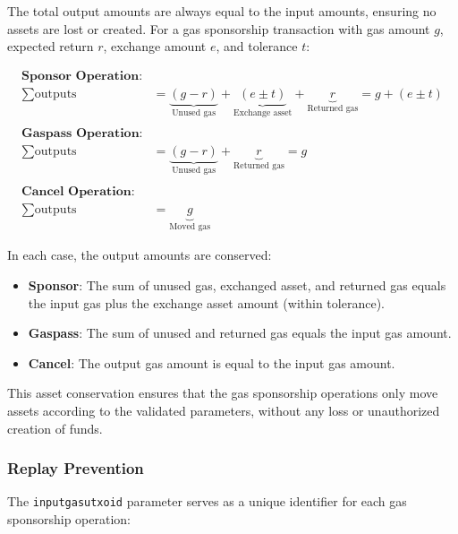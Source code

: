 The total output amounts are always equal to the input amounts, ensuring no assets are lost or created.
For a gas sponsorship transaction with gas amount $g$, expected return $r$, exchange amount $e$, and tolerance $t$:

\begin{equation*}
\begin{aligned}
\textbf{Sponsor Operation:} \\
\sum \text{outputs} &= \underbrace{(g - r)}_{\text{Unused gas}} + \underbrace{(e \pm t)}_{\text{Exchange asset}} + \underbrace{r}_{\text{Returned gas}} = g + (e \pm t) \\
\\
\textbf{Gaspass Operation:} \\
\sum \text{outputs} &= \underbrace{(g - r)}_{\text{Unused gas}} + \underbrace{r}_{\text{Returned gas}} = g \\
\\
\textbf{Cancel Operation:} \\
\sum \text{outputs} &= \underbrace{g}_{\text{Moved gas}}
\end{aligned}
\end{equation*}

In each case, the output amounts are conserved:
\begin{itemize}
\item \textbf{Sponsor}: The sum of unused gas, exchanged asset, and returned gas equals the input gas plus the exchange asset amount (within tolerance).
\item \textbf{Gaspass}: The sum of unused and returned gas equals the input gas amount.
\item \textbf{Cancel}: The output gas amount is equal to the input gas amount.
\end{itemize}

This asset conservation ensures that the gas sponsorship operations only move assets according to the validated parameters, without any loss or unauthorized creation of funds.\\







\subsubsection{Replay Prevention}
The \texttt{inputgasutxoid} parameter serves as a unique identifier for each gas sponsorship operation:

